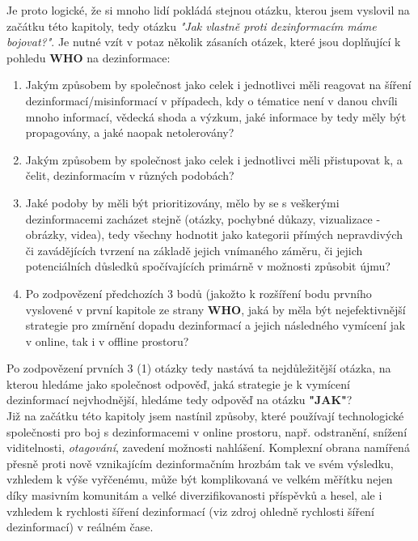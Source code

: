 Je proto logické, že si mnoho lidí pokládá stejnou otázku, kterou jsem vyslovil na začátku této kapitoly, tedy otázku \textit{"Jak vlastně proti dezinformacím máme bojovat?"}. Je nutné vzít v potaz několik zásaních otázek, které jsou doplňující k pohledu \textbf{WHO} na dezinformace:\\

\begin{enumerate}
\item Jakým způsobem by společnost jako celek i jednotlivci měli reagovat na šíření dezinformací/misinformací v případech, kdy o tématice není v danou chvíli mnoho informací, vědecká shoda a výzkum, jaké informace by tedy měly být propagovány, a jaké naopak netolerovány?
\item Jakým způsobem by společnost jako celek i jednotlivci měli přistupovat k, a čelit, dezinformacím v různých podobách?
\item Jaké podoby by měli být prioritizovány, mělo by se s veškerými dezinformacemi zacházet stejně (otázky, pochybné důkazy, vizualizace - obrázky, videa), tedy všechny hodnotit jako kategorii přímých nepravdivých či zavádějících tvrzení na základě jejich vnímaného záměru, či jejich potenciálních důsledků spočívajících primárně v možnosti způsobit újmu?
\item Po zodpovězení předchozích 3 bodů (jakožto k rozšíření bodu prvního vyslovené v první kapitole ze strany \textbf{WHO}, jaká by měla být nejefektivnější strategie pro zmírnění dopadu dezinformací a jejich následného vymícení jak v online, tak i v offline prostoru? 
\end{enumerate}
\vspace*{5mm}

Po zodpovězení prvních 3 (1) otázky tedy nastává ta nejdůležitější otázka, na kterou hledáme jako společnost odpověď, jaká strategie je k vymícení dezinformací nejvhodnější, hledáme tedy odpověď na otázku \textbf{"JAK"}?\\

Již na začátku této kapitoly jsem nastínil způsoby, které používají technologické společnosti pro boj s dezinformacemi v online prostoru,  např. odstranění, snížení viditelnosti, \textit{otagování}, zavedení možnosti nahlášení. Komplexní obrana namířená přesně proti nově vznikajícím dezinformačním hrozbám tak ve svém výsledku, vzhledem k výše vyřčenému, může být komplikovaná ve velkém měřítku nejen díky masivním komunitám a velké diverzifikovanosti příspěvků a hesel, ale i vzhledem k rychlosti šíření dezinformací (viz zdroj ohledně rychlosti šíření dezinformací) v reálném čase.\\

